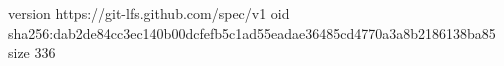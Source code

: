 version https://git-lfs.github.com/spec/v1
oid sha256:dab2de84cc3ec140b00dcfefb5c1ad55eadae36485cd4770a3a8b2186138ba85
size 336
